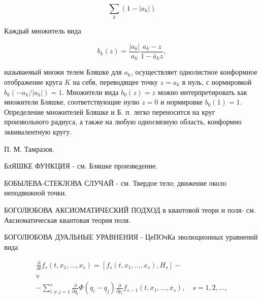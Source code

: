 \documentclass[10pt]{article}
\begin{document}
\[

\sum_{k}\left(1-\left|a_{k}\right|\right)

\]



Каждый множитель вида



\[

b_{k}(z)=\frac{\left|a_{k}\right|}{a_{k}} \frac{a_{k}-z}{1-\bar{a}_{k} z},

\]



называемый множи телем Бляшке для $a_{k}$, осуществляет однолистное конформное отображение круга $K$ на себя, переводящее точку $z=a_{k}$ в нуль, с нормировкой $b_{k}\left(-a_{k} /\left|a_{k}\right|\right)=1$. Множители вида $b_{0}(z)=z$ можно интерпретировать как множители Бляшке, соответствующие нулю $z=0$ и нормировке $b_{0}(1)=1$. Определение множителей Бляшке и Б. п. легко переносится на круг произвольного радиуса, а также на любую односвязную область, конформно эквивалентную кругу.



П. М. Тамразов.



БлЯШКЕ ФУНКЦИЯ - см. Бляшке произведение.



БОБЫЛЕВА-СТЕКЛОВА СЛУЧАЙ - см. Твердое тело; движение около неподвижной точки.



БОГОЛЮБОВА АКСИОМАТИЧЕСКИЙ ПОДХОД в квантовой теори и поля- см. Аксиоматическая квантовая теория поля.



БОГОЛЮБОВА ДУАЛЬНЫЕ УРАВНЕНИЯ - ЦеПОчКа эволюционных уравнений вида



\[

\begin{gathered}

\frac{\partial}{\partial t} f_{s}\left(t, x_{1}, \ldots, x_{s}\right)=\left[f_{s}\left(t, x_{1}, \ldots, x_{s}\right), H_{s}\right]- \\

\dot{v} \\

-\sum_{i \neq j=1}^{s} \frac{\partial}{\partial q_{i}} \Phi\left(q_{i}-q_{j}\right) \frac{\partial}{\partial p_{i}} f_{s-1}\left(t, x_{1}, \ldots, x_{s}\right), \quad s=1,2, \ldots,

\end{gathered}

\]
\end{document}
